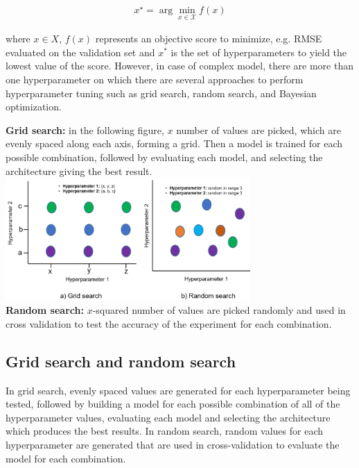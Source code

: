 \vspace{-6mm}
\begin{align}
    x^{\star}=\arg \min _{x \in \mathcal{X}} f(x)
    \label{eq:hpt}
\end{align}

where $x \in X$, $f(x)$ represents an objective score to minimize, e.g. RMSE evaluated on the validation set and $x^*$ is the set of hyperparameters to yield the lowest value of the score. However, in case of complex model, there are more than one hyperparameter on which there are several approaches to perform hyperparameter tuning such as grid search, random search, and Bayesian optimization. \\

\begin{tcolorbox}[colback=white!3!white,colframe=gray!120!black,title=\faBook~Random vs. grid search for hyperparameter optimization]
    \scriptsize{
        \textbf{Grid search:} in the following figure, $x$ number of values are picked, which are evenly spaced along each axis, forming a grid. Then a model is trained for each possible combination, followed by evaluating each model, and selecting the architecture giving the best result. \\
        }
    \includegraphics[width=0.7\textwidth]{images/gvr.png}\\ 
    \scriptsize{
        \textbf{Random search:} $x$-squared number of values are picked randomly and used in cross validation to test the accuracy of the experiment for each combination.
        } 
\end{tcolorbox}

\subsection{Grid search and random search}
In grid search, evenly spaced values are generated for each hyperparameter being tested, followed by building a model for each possible combination of all of the hyperparameter values, evaluating each model and selecting the architecture which produces the best results. %
In random search, random values for each hyperparameter are generated that are used in cross-validation to evaluate the model for each combination.

